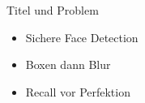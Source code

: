 \begin{frame}{Titel und Problem}
\begin{itemize}
    \item Sichere Face Detection
    \item Boxen dann Blur
    \item Recall vor Perfektion
\end{itemize}
\end{frame}
